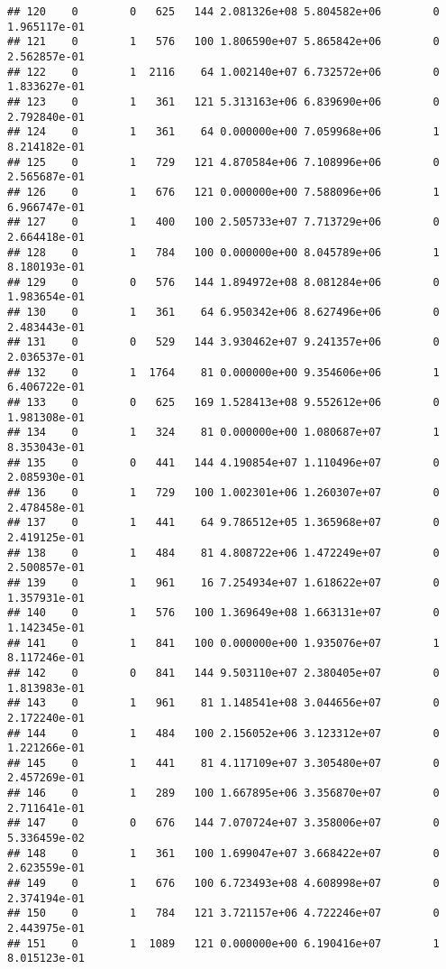 \documentclass[
]{article}
\begin{document}
\begin{enumerate}
\begin{verbatim}
## 120    0        0   625   144 2.081326e+08 5.804582e+06        0  1.965117e-01
## 121    0        1   576   100 1.806590e+07 5.865842e+06        0  2.562857e-01
## 122    0        1  2116    64 1.002140e+07 6.732572e+06        0  1.833627e-01
## 123    0        1   361   121 5.313163e+06 6.839690e+06        0  2.792840e-01
## 124    0        1   361    64 0.000000e+00 7.059968e+06        1  8.214182e-01
## 125    0        1   729   121 4.870584e+06 7.108996e+06        0  2.565687e-01
## 126    0        1   676   121 0.000000e+00 7.588096e+06        1  6.966747e-01
## 127    0        1   400   100 2.505733e+07 7.713729e+06        0  2.664418e-01
## 128    0        1   784   100 0.000000e+00 8.045789e+06        1  8.180193e-01
## 129    0        0   576   144 1.894972e+08 8.081284e+06        0  1.983654e-01
## 130    0        1   361    64 6.950342e+06 8.627496e+06        0  2.483443e-01
## 131    0        0   529   144 3.930462e+07 9.241357e+06        0  2.036537e-01
## 132    0        1  1764    81 0.000000e+00 9.354606e+06        1  6.406722e-01
## 133    0        0   625   169 1.528413e+08 9.552612e+06        0  1.981308e-01
## 134    0        1   324    81 0.000000e+00 1.080687e+07        1  8.353043e-01
## 135    0        0   441   144 4.190854e+07 1.110496e+07        0  2.085930e-01
## 136    0        1   729   100 1.002301e+06 1.260307e+07        0  2.478458e-01
## 137    0        1   441    64 9.786512e+05 1.365968e+07        0  2.419125e-01
## 138    0        1   484    81 4.808722e+06 1.472249e+07        0  2.500857e-01
## 139    0        1   961    16 7.254934e+07 1.618622e+07        0  1.357931e-01
## 140    0        1   576   100 1.369649e+08 1.663131e+07        0  1.142345e-01
## 141    0        1   841   100 0.000000e+00 1.935076e+07        1  8.117246e-01
## 142    0        0   841   144 9.503110e+07 2.380405e+07        0  1.813983e-01
## 143    0        1   961    81 1.148541e+08 3.044656e+07        0  2.172240e-01
## 144    0        1   484   100 2.156052e+06 3.123312e+07        0  1.221266e-01
## 145    0        1   441    81 4.117109e+07 3.305480e+07        0  2.457269e-01
## 146    0        1   289   100 1.667895e+06 3.356870e+07        0  2.711641e-01
## 147    0        0   676   144 7.070724e+07 3.358006e+07        0  5.336459e-02
## 148    0        1   361   100 1.699047e+07 3.668422e+07        0  2.623559e-01
## 149    0        1   676   100 6.723493e+08 4.608998e+07        0  2.374194e-01
## 150    0        1   784   121 3.721157e+06 4.722246e+07        0  2.443975e-01
## 151    0        1  1089   121 0.000000e+00 6.190416e+07        1  8.015123e-01

\end{verbatim}
\end{enumerate}
\end{document}
